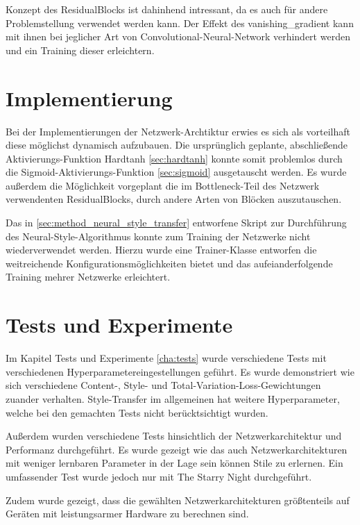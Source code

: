Konzept des ResidualBlocks ist dahinhend intressant, da es auch für andere Problemstellung verwendet werden kann. Der Effekt des \gls{vanishing_gradient} kann mit ihnen bei jeglicher Art von Convolutional-Neural-Network verhindert werden und ein Training dieser erleichtern.

\section{Implementierung}

Bei der Implementierungen der Netzwerk-Archtiktur erwies es sich als vorteilhaft diese möglichst dynamisch aufzubauen. Die ursprünglich geplante, abschließende Aktivierungs-Funktion Hardtanh \ref{sec:hardtanh} konnte somit problemlos durch die Sigmoid-Aktivierungs-Funktion \ref{sec:sigmoid} ausgetauscht werden. Es wurde außerdem die Möglichkeit vorgeplant die im Bottleneck-Teil des Netzwerk verwendenten ResidualBlocks, durch andere Arten von Blöcken auszutauschen.

Das in \ref{sec:method_neural_style_transfer} entworfene Skript zur Durchführung des Neural-Style-Algorithmus konnte zum Training der Netzwerke nicht wiederverwendet werden. Hierzu wurde eine Trainer-Klasse entworfen die weitreichende Konfigurationsmöglichkeiten bietet und das aufeianderfolgende Training mehrer Netzwerke erleichtert.

\section{Tests und Experimente}

Im Kapitel Tests und Experimente \ref{cha:tests} wurde verschiedene Tests mit verschiedenen Hyperparametereingestellungen geführt.
Es wurde demonstriert wie sich verschiedene Content-, Style- und Total-Variation-Loss-Gewichtungen zuander verhalten. Style-Transfer im allgemeinen hat weitere Hyperparameter, welche bei den gemachten Tests nicht berücktsichtigt wurden.

Außerdem wurden verschiedene Tests hinsichtlich der Netzwerkarchitektur und Performanz durchgeführt. Es wurde gezeigt wie das auch Netzwerkarchitekturen mit weniger lernbaren Parameter in der Lage sein können Stile zu erlernen. Ein umfassender Test wurde jedoch nur mit The Starry Night \cite{the_starry_night_img} durchgeführt.

Zudem wurde gezeigt, dass die gewählten Netzwerkarchitekturen größtenteils auf Geräten mit leistungsarmer Hardware zu berechnen sind.